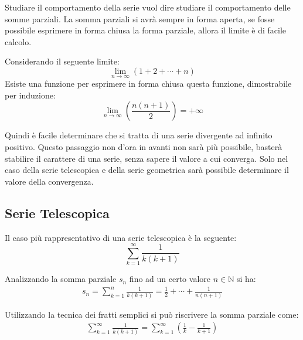 \documentclass{article}
\numberwithin{equation}{subsection}
\begin{document}
Studiare il comportamento della serie vuol dire studiare il comportamento delle somme parziali. La somma parziali si avrà sempre in forma aperta, se fosse possibile esprimere in forma chiusa la forma parziale, allora il limite è di facile calcolo. 


Considerando il seguente limite:
\begin{equation*}
    \lim_{n\to\infty}(1+2+\cdots+n)
\end{equation*}
Esiste una funzione per esprimere in forma chiusa questa funzione, dimostrabile per induzione:
\begin{equation*}
    \lim_{n\to\infty}\left(\displaystyle\frac{n(n+1)}{2}\right)=+\infty
\end{equation*}

Quindi è facile determinare che si tratta di una serie divergente ad infinito positivo. Questo passaggio non d'ora in avanti non sarà più possibile, basterà stabilire il carattere di una serie, senza sapere il valore a cui converga. Solo nel caso della serie telescopica e della serie geometrica sarà possibile determinare il valore della convergenza. 

\subsection{Serie Telescopica}

Il caso più rappresentativo di una serie telescopica è la seguente:
\begin{equation}
    \displaystyle\sum_{k=1}^\infty\frac{1}{k(k+1)}
\end{equation}

Analizzando la somma parziale $s_n$ fino ad un certo valore $n\in\mathbb{N}$ si ha:
\begin{gather*}
    s_n=\displaystyle\sum_{k=1}^n\frac{1}{k(k+1)}=\frac{1}{2}+\cdots+\frac{1}{n(n+1)}
\end{gather*} 

Utilizzando la tecnica dei fratti semplici si può riscrivere la somma parziale come:
\begin{gather*}
    \displaystyle\sum_{k=1}^\infty\frac{1}{k(k+1)}=\sum_{k=1}^\infty\left(\frac{1}{k}-\frac{1}{k+1}\right)
\end{gather*}
\end{document}
